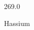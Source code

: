\documentclass[12pt]{article}
\begin{document}
\hfill{}
\vfill
\begin{center}
  {\fontsize{50}{60}
  }

  \vspace{1em}

  269.0

Hassium
\end{center}
\vfill
\end{document}

